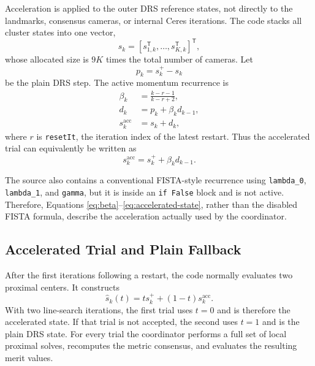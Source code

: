 \documentclass[11pt]{article}
\begin{document}
Acceleration is applied to the outer DRS reference states, not directly to
the landmarks, consensus cameras, or internal Ceres iterations.  The code
stacks all cluster states into one vector,
\begin{equation}
  s_k = [s_{1,k}^{\mathsf T},\ldots,s_{K,k}^{\mathsf T}]^{\mathsf T},
\end{equation}
whose allocated size is $9K$ times the total number of cameras.  Let
\begin{equation}
  p_k=s_k^{+}-s_k
\end{equation}
be the plain DRS step.  The active momentum recurrence is
\begin{align}
  \beta_k &= \frac{k-r-1}{k-r+2},
  \label{eq:beta}\\
  d_k &= p_k+\beta_k d_{k-1},
  \label{eq:direction}\\
  s_k^{\mathrm{acc}} &= s_k+d_k,
  \label{eq:accelerated-state}
\end{align}
where $r$ is \verb|resetIt|, the iteration index of the latest restart.  Thus
the accelerated trial can equivalently be written as
\begin{equation}
  s_k^{\mathrm{acc}}=s_k^{+}+\beta_k d_{k-1}.
\end{equation}

The source also contains a conventional FISTA-style recurrence using
\verb|lambda_0|, \verb|lambda_1|, and \verb|gamma|, but it is inside an
\verb|if False| block and is not active.  Therefore, Equations
\eqref{eq:beta}--\eqref{eq:accelerated-state}, rather than the disabled FISTA
formula, describe the acceleration actually used by the coordinator.

\subsection{Accelerated Trial and Plain Fallback}

After the first iterations following a restart, the code normally evaluates
two proximal centers.  It constructs
\begin{equation}
  \widehat{s}_k(t)
  =t s_k^{+}+(1-t)s_k^{\mathrm{acc}}.
  \label{eq:trial-interpolation}
\end{equation}
With two line-search iterations, the first trial uses $t=0$ and is therefore
the accelerated state.  If that trial is not accepted, the second uses $t=1$
and is the plain DRS state.  For every trial the coordinator performs a full
set of local proximal solves, recomputes the metric consensus, and evaluates
the resulting merit values.
\end{document}
